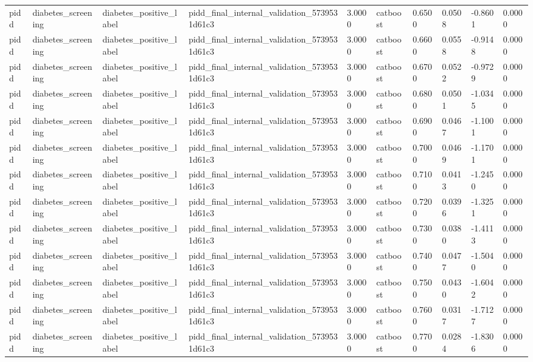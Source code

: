 \begin{tabular}{llllllllll}
pidd & diabetes\_screening & diabetes\_positive\_label & pidd\_final\_internal\_validation\_5739531d61c3 & 3.0000 & catboost & 0.6500 & 0.0508 & -0.8601 & 0.0000 \\
pidd & diabetes\_screening & diabetes\_positive\_label & pidd\_final\_internal\_validation\_5739531d61c3 & 3.0000 & catboost & 0.6600 & 0.0558 & -0.9148 & 0.0000 \\
pidd & diabetes\_screening & diabetes\_positive\_label & pidd\_final\_internal\_validation\_5739531d61c3 & 3.0000 & catboost & 0.6700 & 0.0522 & -0.9729 & 0.0000 \\
pidd & diabetes\_screening & diabetes\_positive\_label & pidd\_final\_internal\_validation\_5739531d61c3 & 3.0000 & catboost & 0.6800 & 0.0501 & -1.0345 & 0.0000 \\
pidd & diabetes\_screening & diabetes\_positive\_label & pidd\_final\_internal\_validation\_5739531d61c3 & 3.0000 & catboost & 0.6900 & 0.0467 & -1.1001 & 0.0000 \\
pidd & diabetes\_screening & diabetes\_positive\_label & pidd\_final\_internal\_validation\_5739531d61c3 & 3.0000 & catboost & 0.7000 & 0.0469 & -1.1701 & 0.0000 \\
pidd & diabetes\_screening & diabetes\_positive\_label & pidd\_final\_internal\_validation\_5739531d61c3 & 3.0000 & catboost & 0.7100 & 0.0413 & -1.2450 & 0.0000 \\
pidd & diabetes\_screening & diabetes\_positive\_label & pidd\_final\_internal\_validation\_5739531d61c3 & 3.0000 & catboost & 0.7200 & 0.0396 & -1.3251 & 0.0000 \\
pidd & diabetes\_screening & diabetes\_positive\_label & pidd\_final\_internal\_validation\_5739531d61c3 & 3.0000 & catboost & 0.7300 & 0.0380 & -1.4113 & 0.0000 \\
pidd & diabetes\_screening & diabetes\_positive\_label & pidd\_final\_internal\_validation\_5739531d61c3 & 3.0000 & catboost & 0.7400 & 0.0477 & -1.5040 & 0.0000 \\
pidd & diabetes\_screening & diabetes\_positive\_label & pidd\_final\_internal\_validation\_5739531d61c3 & 3.0000 & catboost & 0.7500 & 0.0430 & -1.6042 & 0.0000 \\
pidd & diabetes\_screening & diabetes\_positive\_label & pidd\_final\_internal\_validation\_5739531d61c3 & 3.0000 & catboost & 0.7600 & 0.0317 & -1.7127 & 0.0000 \\
pidd & diabetes\_screening & diabetes\_positive\_label & pidd\_final\_internal\_validation\_5739531d61c3 & 3.0000 & catboost & 0.7700 & 0.0284 & -1.8306 & 0.0000 \\

\end{tabular}
